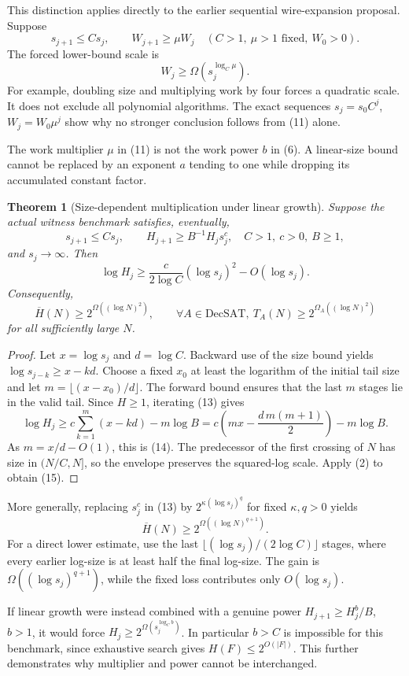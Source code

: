 \documentclass[11pt]{article}
\newtheorem{theorem}{Theorem}
\newcommand{\Hbar}{\overline H}
\begin{document}
This distinction applies directly to the earlier sequential
wire-expansion proposal. Suppose
\[
 s_{j+1}\le C s_j,\qquad W_{j+1}\ge\mu W_j
 \quad(C>1,\ \mu>1\text{ fixed},\ W_0>0).
 \tag{11}
\]
The forced lower-bound scale is
\[
 W_j\ge\Omega(s_j^{\log_C\mu}).
 \tag{12}
\]
For example, doubling size and multiplying work by four forces a quadratic
scale. It does not exclude all polynomial algorithms.
The exact sequences $s_j=s_0C^j$, $W_j=W_0\mu^j$ show why no stronger
conclusion follows from (11) alone.

The work multiplier $\mu$ in (11) is not the work power $b$ in (6).
A linear-size bound cannot be replaced by an exponent $a$ tending to one
while dropping its accumulated constant factor.

\begin{theorem}[Size-dependent multiplication under linear growth]
Suppose the \emph{actual witness benchmark} satisfies, eventually,
\[
 s_{j+1}\le C s_j,\qquad
 H_{j+1}\ge B^{-1}H_j s_j^c,
 \quad C>1,\ c>0,\ B\ge1,
 \tag{13}
\]
and $s_j\to\infty$. Then
\[
 \log H_j\ge
 \frac{c}{2\log C}(\log s_j)^2-O(\log s_j).
 \tag{14}
\]
Consequently,
\[
 \Hbar(N)\ge 2^{\Omega((\log N)^2)},\qquad
 \forall A\in\mathrm{DecSAT},\
 T_A(N)\ge2^{\Omega_A((\log N)^2)}
 \tag{15}
\]
for all sufficiently large $N$.
\end{theorem}

\begin{proof}
Let $x=\log s_j$ and $d=\log C$. Backward use of the size bound yields
$\log s_{j-k}\ge x-kd$. Choose a fixed $x_0$ at least the logarithm of
the initial tail size and let $m=\lfloor(x-x_0)/d\rfloor$.
The forward bound ensures that the last $m$ stages lie in the valid tail.
Since $H\ge1$, iterating (13) gives
\[
 \log H_j
 \ge c\sum_{k=1}^m(x-kd)-m\log B
 =c\left(mx-\frac{d\,m(m+1)}2\right)-m\log B.
\]
As $m=x/d-O(1)$, this is (14).
The predecessor of the first crossing of $N$ has size in $(N/C,N]$,
so the envelope preserves the squared-log scale. Apply (2) to obtain (15).
\end{proof}

More generally, replacing $s_j^c$ in (13) by
$2^{\kappa(\log s_j)^q}$ for fixed $\kappa,q>0$ yields
\[
 \Hbar(N)\ge 2^{\Omega((\log N)^{q+1})}.
 \tag{16}
\]
For a direct lower estimate, use the last
$\lfloor(\log s_j)/(2\log C)\rfloor$ stages, where every earlier log-size
is at least half the final log-size. The gain is
$\Omega((\log s_j)^{q+1})$, while the fixed loss contributes only
$O(\log s_j)$.

If linear growth were instead combined with a genuine power
$H_{j+1}\ge H_j^b/B$, $b>1$, it would force
$H_j\ge2^{\Omega(s_j^{\log_C b})}$. In particular $b>C$ is impossible for
this benchmark, since exhaustive search gives $H(F)\le2^{O(|F|)}$.
This further demonstrates why multiplier and power cannot be interchanged.
\end{document}
